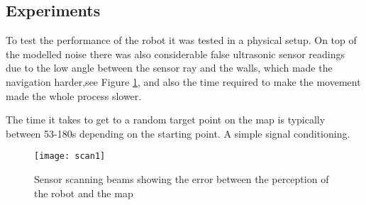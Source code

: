 \subsection{Experiments}

	To test the performance of the robot it was tested in a physical setup. On top of the modelled noise there was also considerable false ultrasonic sensor readings due to the low angle between the sensor ray and the walls, which made the navigation harder,see Figure \ref{fig:scan1}, and also the time required to make the movement made the whole process slower. 
	
	The time it takes to get to a random target point on the map is typically between 53-180s depending on the starting point. A simple signal conditioning.
	
		\begin{figure}[h]
			\centering
			\texttt{[image: scan1]}
			\caption{Sensor scanning beams showing the error between the perception of the robot and the map}
			\label{fig:scan1}
		\end{figure}
		